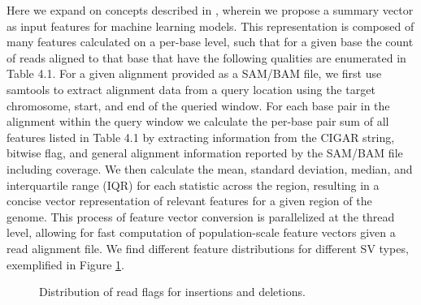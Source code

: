 Here we expand on concepts described in \cite{hillDeepLearningApproach2019}, wherein we propose a summary vector as input features for machine learning models. This representation is composed of many features calculated on a per-base level, such that for a given base the count of reads aligned to that base that have the following qualities are enumerated in Table 4.1. For a given alignment provided as a SAM/BAM file, we first use samtools \cite{danecekTwelveYearsSAMtools2021} to extract alignment data from a query location using the target chromosome, start, and end of the queried window. For each base pair in the alignment within the query window we calculate the per-base pair sum of all features listed in Table 4.1 by extracting information from the CIGAR string, bitwise flag, and general alignment information reported by the SAM/BAM file including coverage. We then calculate the mean, standard deviation, median, and interquartile range (IQR) for each statistic across the region, resulting in a concise vector representation of relevant features for a given region of the genome. This process of feature vector conversion is parallelized at the thread level, allowing for fast computation of population-scale feature vectors given a read alignment file. We find different feature distributions for different SV types, exemplified in Figure \ref{fig:read-dists}.

\begin{figure}
    \centering
    \caption[Distribution of read flags per structural variant type.]{Distribution of read flags for insertions and deletions.}
    \label{fig:read-dists}
\end{figure}

